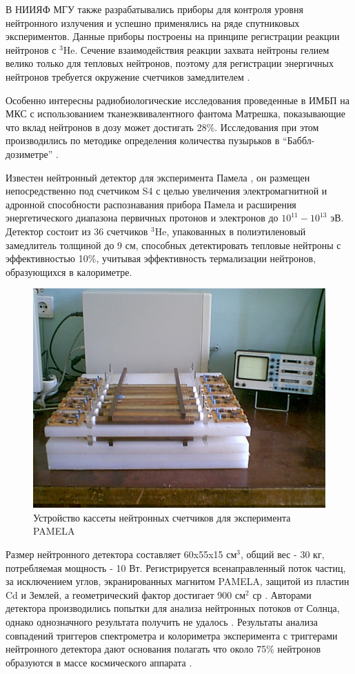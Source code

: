  В НИИЯФ МГУ также разрабатывались приборы для контроля уровня нейтронного излучения \cite{Shavrin1990} и успешно применялись на ряде спутниковых экспериментов. Данные приборы построены на принципе регистрации реакции нейтронов с $ ^{3} $He. Сечение взаимодействия реакции захвата нейтроны гелием велико только для тепловых нейтронов, поэтому для регистрации энергичных нейтронов требуется окружение счетчиков замедлителем \cite{Shavrin2002}.

Особенно интересны радиобиологические исследования проведенные в ИМБП \cite{Shurshakov2016} на МКС с использованием тканеэквивалентного фантома Матрешка, показывающие что вклад нейтронов в дозу может достигать 28\%.  Исследования при этом производились по методике определения количества пузырьков в ``Баббл-дозиметре'' \cite{hulapko2016}.


Известен нейтронный детектор для эксперимента Памела \cite{Menn2013}, он размещен непосредственно под счетчиком S4 с целью увеличения электромагнитной и адронной способности распознавания прибора Памела и расширения энергетического диапазона первичных протонов и электронов до $ 10^{11}-10^{13} $ эВ. Детектор состоит из 36 счетчиков  $ ^{3} $He, упакованных в полиэтиленовый замедлитель толщиной до 9 см, способных детектировать тепловые нейтроны с эффективностью 10\%, учитывая эффективность термализации нейтронов, образующихся в калориметре.

\begin{figure}
	\centering
	\includegraphics[width=0.7\linewidth]{images/neutrons/pamela}
	\caption{Устройство кассеты нейтронных счетчиков для эксперимента PAMELA \cite{Stozhkov2007}}
	\label{fig:pamela}
\end{figure}

Размер нейтронного детектора составляет 60x55x15 см$ ^3 $, общий вес - 30 кг, потребляемая мощность - 10 Вт. Регистрируется всенаправленный поток частиц, за исключением углов, экранированных магнитом PAMELA, защитой из пластин Cd и Землей, а геометрический фактор достигает 900 см$ ^2 $ ср \cite{Stozhkov2007}. Авторами детектора производились попытки для анализа нейтронных потоков от Солнца, однако однозначного результата получить не удалось \cite{Goryacheva2016}. Результаты анализа совпадений триггеров спектрометра и колориметра эксперимента с триггерами нейтронного детектора дают основания полагать что около 75\% нейтронов образуются в массе космического аппарата \cite{Stozhkov2007}.

